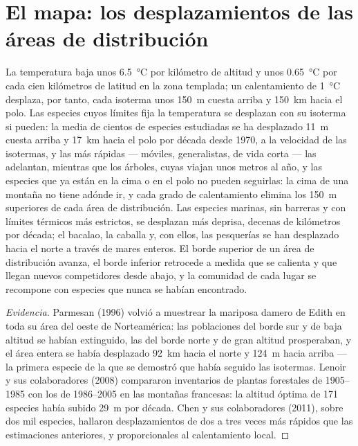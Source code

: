 \section{El mapa: los desplazamientos de las áreas de distribución}

\begin{proposition}\label{prop:b2:global-change:range}
La temperatura baja unos \qty{6.5}{\celsius} por kilómetro de altitud y
unos \qty{0.65}{\celsius} por cada cien kilómetros de latitud en la zona
templada; un calentamiento de \qty{1}{\celsius} desplaza, por tanto, cada
isoterma unos \qty{150}{m} cuesta arriba y \qty{150}{km} hacia el polo.
Las especies cuyos límites fija la temperatura se desplazan con su
isoterma si pueden: la media de cientos de especies estudiadas se ha
desplazado \qty{11}{m} cuesta arriba y \qty{17}{km} hacia el polo por
década desde 1970, a la velocidad de las isotermas, y las más rápidas ---
móviles, generalistas, de vida corta --- las adelantan, mientras que los
árboles, cuyas  viajan unos metros al año, y las especies que ya
están en la cima o en el polo no pueden seguirlas: la cima de una montaña
no tiene adónde ir, y cada grado de calentamiento elimina los
\qty{150}{m} superiores de cada área de distribución. Las especies
marinas, sin barreras y con límites térmicos más estrictos, se desplazan
más deprisa, decenas de kilómetros por década; el bacalao, la caballa y,
con ellos, las pesquerías se han desplazado hacia el norte a través de
mares enteros. El borde superior de un área de distribución avanza, el
borde inferior retrocede a medida que se calienta y que llegan nuevos
competidores desde abajo, y la comunidad de cada lugar se recompone con
especies que nunca se habían encontrado.
\end{proposition}
\begin{proof}[Evidencia]
Parmesan (1996) volvió a muestrear la mariposa damero de Edith
en toda su área del oeste de Norteamérica: las poblaciones del borde sur y
de baja altitud se habían extinguido, las del borde norte y de gran
altitud prosperaban, y el área entera se había desplazado
\qty{92}{km} hacia el norte y \qty{124}{m} hacia arriba --- la primera
especie de la que se demostró que había seguido las isotermas. Lenoir y
sus colaboradores (2008) compararon inventarios de plantas forestales de
1905--1985 con los de 1986--2005 en las montañas francesas: la altitud
óptima de 171 especies había subido \qty{29}{m} por década. Chen y sus
colaboradores (2011), sobre dos mil especies, hallaron desplazamientos de
dos a tres veces más rápidos que las estimaciones anteriores, y
proporcionales al calentamiento local.
\end{proof}

